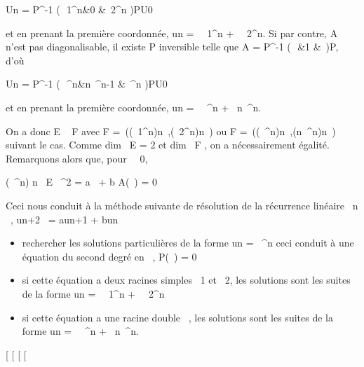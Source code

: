 Un = P^-1\left
(\matrix\,\lambda~1^n&0
 &\lambda~2^n\right
)PU0

et en prenant la première coordonnée, un =
\alpha~\lambda~1^n + \beta~\lambda~2^n. Si par contre, A n'est
pas diagonalisable, il existe P inversible telle que A =
P^-1\left
(\matrix\,\lambda~&1
&\lambda~\right )P, d'où

Un = P^-1\left
(\matrix\,\lambda~^n&n\lambda~^n-1
 &\lambda~^n \right
)PU0

et en prenant la première coordonnée, un = \alpha~\lambda~^n +
\beta~n\lambda~^n.

On a donc E \subset~ F avec F =\
\mathrmVect((\lambda~1^n)n\in{}~,(\lambda~2^n)n\in{}~)
ou F =\
\mathrmVect((\lambda~^n)n\in{}~,(n\lambda~^n)n\in\mathbb{N}~)
suivant le cas. Comme dim~ E = 2 et
dim~ F \leq 2, on a nécessairement égalité.
Remarquons alors que, pour \lambda~\neq~0,

(\lambda~^n) n\in{}~ \in E\quad
\Leftrightarrow \lambda~^2 = a\lambda~ + b
\Leftrightarrow \chi A(\lambda~) = 0

Ceci nous conduit à la méthode suivante de résolution de la récurrence
linéaire \forall~n \in {}~, un+2~ =
aun+1 + bun

\begin{itemize}
\itemsep1pt\parskip0pt
\item
  rechercher les solutions particulières de la forme un =
  \lambda~^n ceci conduit à une équation du second degré en \lambda~, P(\lambda~)
  = 0
\item
  si cette équation a deux racines simples \lambda~1 et \lambda~2,
  les solutions sont les suites de la forme un =
  \alpha~\lambda~1^n + \beta~\lambda~2^n
\item
  si cette équation a une racine double \lambda~, les solutions sont les suites
  de la forme un = \alpha~\lambda~^n + \beta~n\lambda~^n.
\end{itemize}

{[}
{[}
{[}
{[}
